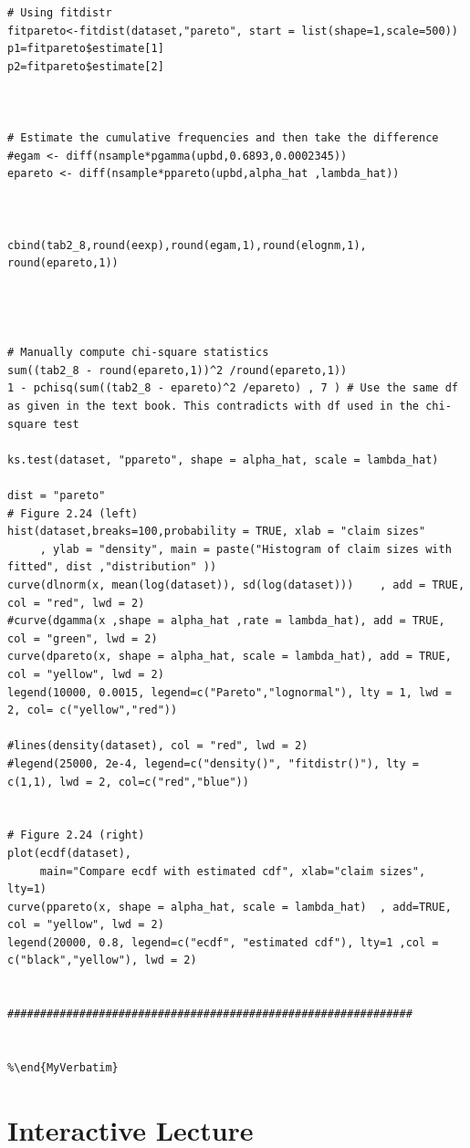 \documentclass[
]{book}
\theoremstyle{definition}
\theoremstyle{definition}
\theoremstyle{definition}
\theoremstyle{definition}
\theoremstyle{remark}
\begin{document}
\begin{verbatim}
# Using fitdistr
fitpareto<-fitdist(dataset,"pareto", start = list(shape=1,scale=500))
p1=fitpareto$estimate[1]
p2=fitpareto$estimate[2]



# Estimate the cumulative frequencies and then take the difference
#egam <- diff(nsample*pgamma(upbd,0.6893,0.0002345))
epareto <- diff(nsample*ppareto(upbd,alpha_hat ,lambda_hat))



cbind(tab2_8,round(eexp),round(egam,1),round(elognm,1), round(epareto,1))




# Manually compute chi-square statistics
sum((tab2_8 - round(epareto,1))^2 /round(epareto,1))
1 - pchisq(sum((tab2_8 - epareto)^2 /epareto) , 7 ) # Use the same df as given in the text book. This contradicts with df used in the chi-square test

ks.test(dataset, "ppareto", shape = alpha_hat, scale = lambda_hat)

dist = "pareto"
# Figure 2.24 (left)
hist(dataset,breaks=100,probability = TRUE, xlab = "claim sizes" 
     , ylab = "density", main = paste("Histogram of claim sizes with fitted", dist ,"distribution" ))
curve(dlnorm(x, mean(log(dataset)), sd(log(dataset)))    , add = TRUE, col = "red", lwd = 2)
#curve(dgamma(x ,shape = alpha_hat ,rate = lambda_hat), add = TRUE, col = "green", lwd = 2)
curve(dpareto(x, shape = alpha_hat, scale = lambda_hat), add = TRUE, col = "yellow", lwd = 2)
legend(10000, 0.0015, legend=c("Pareto","lognormal"), lty = 1, lwd = 2, col= c("yellow","red"))

#lines(density(dataset), col = "red", lwd = 2)
#legend(25000, 2e-4, legend=c("density()", "fitdistr()"), lty = c(1,1), lwd = 2, col=c("red","blue"))


# Figure 2.24 (right)
plot(ecdf(dataset),
     main="Compare ecdf with estimated cdf", xlab="claim sizes", lty=1)
curve(ppareto(x, shape = alpha_hat, scale = lambda_hat)  , add=TRUE, col = "yellow", lwd = 2)
legend(20000, 0.8, legend=c("ecdf", "estimated cdf"), lty=1 ,col = c("black","yellow"), lwd = 2)


##############################################################


%\end{MyVerbatim}
\end{verbatim}

\hypertarget{interactive-lecture}{%
\chapter{Interactive Lecture}\label{interactive-lecture}}
\end{document}
